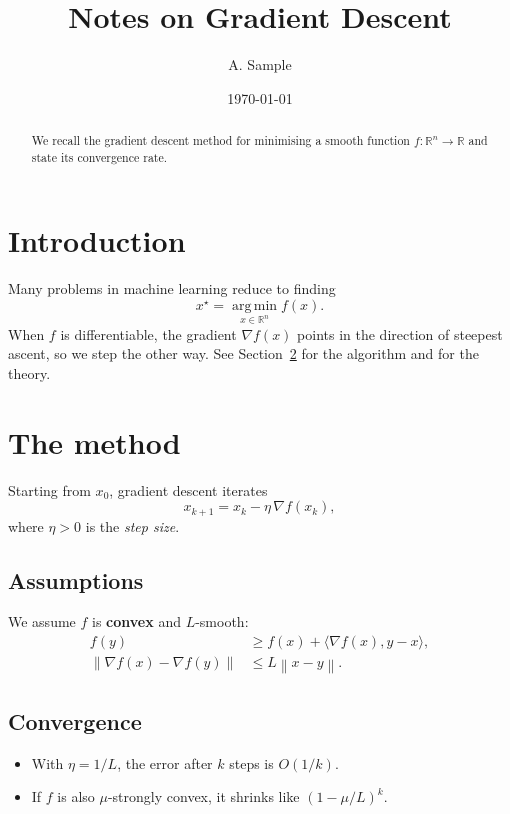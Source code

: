 \documentclass[11pt]{article}
\title{Notes on Gradient Descent}
\author{A. Sample}
\date{\today}
\newcommand{\R}{\mathbb{R}}
\newcommand{\norm}[1]{\left\lVert #1 \right\rVert}
\begin{document}
\maketitle

\begin{abstract}
  We recall the gradient descent method for minimising a smooth function
  $f \colon \R^n \to \R$ and state its convergence rate.
\end{abstract}

\section{Introduction}
\label{sec:intro}

Many problems in machine learning reduce to finding
\[
  x^\star = \operatorname*{arg\,min}_{x \in \R^n} f(x).
\]
When $f$ is differentiable, the gradient $\nabla f(x)$ points in the
direction of steepest ascent, so we step the other way. See
Section~\ref{sec:method} for the algorithm and \cite{nesterov2004} for
the theory.

\section{The method}
\label{sec:method}

Starting from $x_0$, gradient descent iterates
\begin{equation}
  x_{k+1} = x_k - \eta \, \nabla f(x_k),
  \label{eq:update}
\end{equation}
where $\eta > 0$ is the \emph{step size}.

\subsection{Assumptions}

We assume $f$ is \textbf{convex} and $L$-smooth:
\begin{align}
  f(y) &\ge f(x) + \langle \nabla f(x), y - x \rangle, \\
  \norm{\nabla f(x) - \nabla f(y)} &\le L \norm{x - y}.
\end{align}

\subsection{Convergence}

\begin{itemize}
  \item With $\eta = 1/L$, the error after $k$ steps is $O(1/k)$.
  \item If $f$ is also $\mu$-strongly convex, it shrinks like
        $\left(1 - \mu / L\right)^k$.
\end{itemize}
\end{document}
